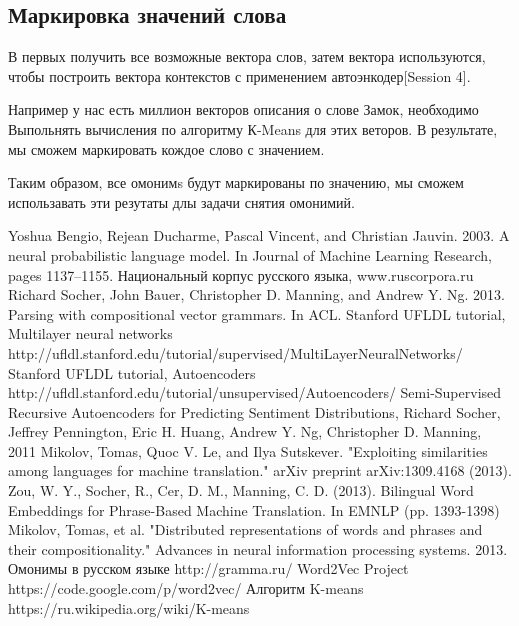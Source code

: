 \documentclass[12pt]{article}
\begin{document}
	

\subsection{Маркировка значений слова}

В первых получить все возможные вектора слов, затем вектора используются, чтобы построить вектора контекстов с применением автоэнкодер[Session 4].

Например у нас есть миллион векторов описания о слове Замок, необходимо Выпольнять вычисления по алгоритму К-Means для этих веторов. В результате, мы сможем маркировать кождое слово с  значением.

Таким образом, все омонимs будут маркированы по значению, мы сможем использавать эти резутаты длы задачи снятия омонимий.

\begin{thebibliography}{0}
Yoshua Bengio, Rejean Ducharme, Pascal Vincent, and Christian Jauvin. 2003. A neural probabilistic language model. In Journal of Machine Learning Research, pages 1137–1155.
Национальный корпус русского языка, www.ruscorpora.ru
Richard Socher, John Bauer, Christopher D. Manning, and Andrew Y. Ng. 2013. Parsing with compositional vector grammars. In ACL.
Stanford UFLDL tutorial, Multilayer neural networks http://ufldl.stanford.edu/tutorial/supervised/MultiLayerNeuralNetworks/
Stanford UFLDL tutorial, Autoencoders http://ufldl.stanford.edu/tutorial/unsupervised/Autoencoders/
Semi-Supervised Recursive Autoencoders for Predicting Sentiment Distributions, Richard Socher, Jeffrey Pennington, Eric H. Huang, Andrew Y. Ng, Christopher D. Manning, 2011
Mikolov, Tomas, Quoc V. Le, and Ilya Sutskever. "Exploiting similarities among languages for machine translation." arXiv preprint arXiv:1309.4168 (2013).
\bibitem{}
Zou, W. Y., Socher, R., Cer, D. M., Manning, C. D. (2013). Bilingual Word Embeddings for Phrase-Based Machine Translation. In EMNLP (pp. 1393-1398)
\bibitem{}
Mikolov, Tomas, et al. "Distributed representations of words and phrases and their compositionality." Advances in neural information processing systems. 2013.
\bibitem{} 
Омонимы в русском языке http://gramma.ru/
\bibitem{}
Word2Vec Project https://code.google.com/p/word2vec/
\bibitem{}
Алгоритм K-means https://ru.wikipedia.org/wiki/K-means

\end{thebibliography}
\end{document}
